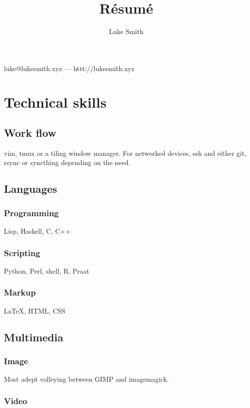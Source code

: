 \documentclass{article}
\makeatletter
\renewcommand{\maketitle}{
\begin{center}
	{\huge\bfseries
	\theauthor}   %

	\vspace{.25em}

	luke@lukesmith.xyz --- httt://lukesmith.xyz

\end{center}
}
\makeatother
\begin{document}
\title{R\'esum\'e}
\author{Luke Smith}

\maketitle

\section{Technical skills}

\subsection{Work flow}

vim, tmux or a tiling window manager. For networked devices, ssh and either git, rsync or syncthing depending on the need.

\subsection{Languages}

\subsubsection{Programming}

Lisp, Haskell, C, C++

\subsubsection{Scripting}

Python, Perl, shell, R, Praat

\subsubsection{Markup}

{\LaTeX}, HTML, CSS

\subsection{Multimedia}

\subsubsection{Image}

Most adept volleying between GIMP and imagemagick.

\subsubsection{Video}
\end{document}
